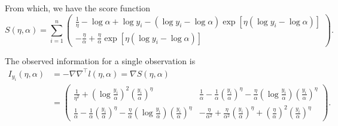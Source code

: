 \documentclass[letterpaper,11pt]{article}
\begin{document}
\begin{enumerate}
\begin{enumerate}
\begin{description}
    From which, we have the score function
    \begin{equation*}
      S\left(\eta,\alpha\right) = \sum_{i=1}^n
      \begin{pmatrix}
        \frac{1}{\eta} - \log\alpha + \log y_i -
        \left(\log y_i - \log\alpha\right)
        \exp\left[\eta\left(\log y_i - \log\alpha\right)\right]
        \\
        -\frac{\eta}{\alpha}
        +\frac{\eta}{\alpha}\exp\left[\eta\left(\log y_i - \log\alpha\right)\right]
      \end{pmatrix}.
    \end{equation*}

    The observed information for a single observation is
    \begin{align*}
      I_{y_i}\left(\eta, \alpha\right)
      &= -\nabla \nabla^\intercal l\left(\eta,\alpha\right) = \nabla S\left(\eta,\alpha\right) \\
      &= \begin{pmatrix}
        \frac{1}{\eta^2} + \left(\log \frac{y_i}{\alpha}\right)^2
        \left(\frac{y_i}{\alpha}\right)^\eta
        &
        \frac{1}{\alpha} - \frac{1}{\alpha}\left(\frac{y_i}{\alpha}\right)^\eta -
        \frac{\eta}{\alpha}\left(\log \frac{y_i}{\alpha}\right)\left(\frac{y_i}{\alpha}\right)^\eta
        \\
        \frac{1}{\alpha} - \frac{1}{\alpha}\left(\frac{y_i}{\alpha}\right)^\eta -
        \frac{\eta}{\alpha}\left(\log \frac{y_i}{\alpha}\right)\left(\frac{y_i}{\alpha}\right)^\eta
        &
        -\frac{\eta}{\alpha^2} + \frac{\eta}{\alpha^2}\left(\frac{y_i}{\alpha}\right)^\eta
        + \left(\frac{\eta}{\alpha}\right)^2\left(\frac{y_i}{\alpha}\right)^\eta
      \end{pmatrix}.
    \end{align*}
  \end{description}
\end{enumerate}
\end{enumerate}
\end{document}
